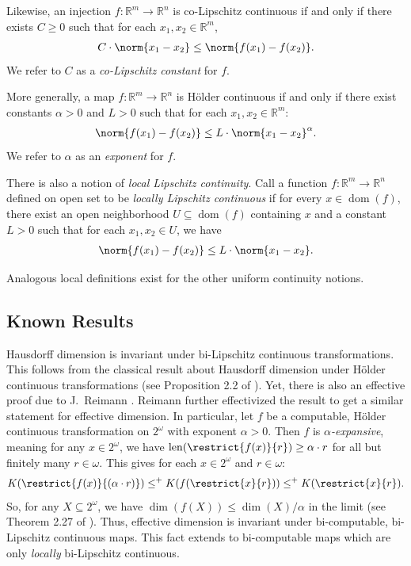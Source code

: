 Likewise, an injection $f: \mathbb{R}^m \to \mathbb{R}^n$ is co-Lipschitz continuous if and only if there exists $C \geq 0$ such that for each $x_1, x_2 \in \mathbb{R}^m$, 
\begin{align*}
     C \cdot \norm{x_1 - x_2} \leq \norm{f(x_1) - f(x_2)}.
\end{align*}
We refer to $C$ as a \textit{co-Lipschitz constant} for $f$.

More generally, a map $f : \mathbb{R}^m \to \mathbb{R}^n$ is H{\"o}lder continuous if and only if there exist constants $\alpha > 0$ and $L > 0$ such that for each $x_1, x_2 \in \mathbb{R}^m$:
\begin{align*}
    \norm{f(x_1) - f(x_2)} \leq L \cdot \norm{x_1 - x_2}^\alpha.
\end{align*}
We refer to $\alpha$ as an \textit{exponent} for $f$.

There is also a notion of \textit{local Lipschitz continuity}. Call a function $f : \mathbb{R}^m \to \mathbb{R}^n$ defined on open set to be \textit{locally Lipschitz continuous} if for every $x \in \operatorname{dom}(f)$, there exist an open neighborhood $U \subseteq \operatorname{dom}(f)$ containing $x$ and a constant $L > 0$ such that for each  $x_1, x_2 \in U$, we have
\begin{align*}
    \norm{f(x_1) - f(x_2)} \leq L \cdot \norm{x_1 - x_2}.
\end{align*}

Analogous local definitions exist for the other uniform continuity notions. 

\subsection{Known Results}

Hausdorff dimension is invariant under bi-Lipschitz continuous transformations. This follows from the classical result about Hausdorff dimension under H{\"o}lder continuous transformations (see Proposition 2.2 of \cite{Fal90}). Yet, there is also an effective proof due to J.~Reimann \cite{Rei04}. Reimann further effectivized the result to get a similar statement for effective dimension. In particular, let $f$ be a computable, H{\"o}lder continuous transformation on $2^\omega$ with exponent $\alpha > 0$. Then $f$ is \textit{$\alpha$-expansive}, meaning for any $x \in 2^\omega$, we have $\operatorname{len}(\restrict{f(x)}{r}) \geq \alpha \cdot r$ for all but finitely many $r \in \omega$. This gives for each $x \in 2^\omega$ and $r \in \omega$:
\begin{align*}
    K(\restrict{f(x)}{(\alpha \cdot r)}) \leq^+ K(f(\restrict{x}{r})) \leq^+ K(\restrict{x}{r}).
\end{align*}
So, for any $X \subseteq 2^\omega$, we have $\dim(f(X)) \leq \dim(X) / \alpha$ in the limit (see Theorem 2.27 of \cite{Rei04}). Thus, effective dimension is invariant under bi-computable, bi-Lipschitz continuous maps. This fact extends to bi-computable maps which are only \textit{locally} bi-Lipschitz continuous.

